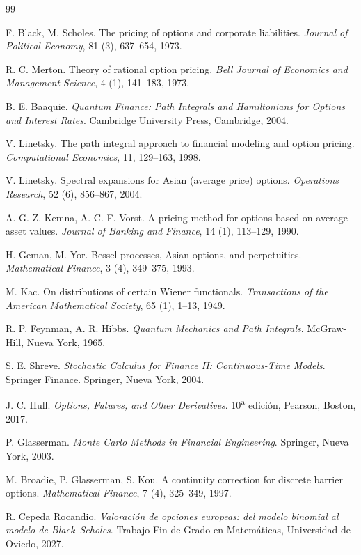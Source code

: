 \begin{thebibliography}{99}

F. Black, M. Scholes.
The pricing of options and corporate liabilities.
\emph{Journal of Political Economy}, 81 (3), 637--654, 1973.

R. C. Merton.
Theory of rational option pricing.
\emph{Bell Journal of Economics and Management Science}, 4 (1),
141--183, 1973.

B. E. Baaquie.
\emph{Quantum Finance: Path Integrals and Hamiltonians for Options
and Interest Rates}.
Cambridge University Press, Cambridge, 2004.

V. Linetsky.
The path integral approach to financial modeling and option pricing.
\emph{Computational Economics}, 11, 129--163, 1998.

V. Linetsky.
Spectral expansions for Asian (average price) options.
\emph{Operations Research}, 52 (6), 856--867, 2004.

A. G. Z. Kemna, A. C. F. Vorst.
A pricing method for options based on average asset values.
\emph{Journal of Banking and Finance}, 14 (1), 113--129, 1990.

H. Geman, M. Yor.
Bessel processes, Asian options, and perpetuities.
\emph{Mathematical Finance}, 3 (4), 349--375, 1993.

M. Kac.
On distributions of certain Wiener functionals.
\emph{Transactions of the American Mathematical Society}, 65 (1),
1--13, 1949.

R. P. Feynman, A. R. Hibbs.
\emph{Quantum Mechanics and Path Integrals}.
McGraw-Hill, Nueva York, 1965.

S. E. Shreve.
\emph{Stochastic Calculus for Finance II: Continuous-Time Models}.
Springer Finance. Springer, Nueva York, 2004.

J. C. Hull.
\emph{Options, Futures, and Other Derivatives}.
10\textsuperscript{a} edición, Pearson, Boston, 2017.

P. Glasserman.
\emph{Monte Carlo Methods in Financial Engineering}.
Springer, Nueva York, 2003.

M. Broadie, P. Glasserman, S. Kou.
A continuity correction for discrete barrier options.
\emph{Mathematical Finance}, 7 (4), 325--349, 1997.

R. Cepeda Rocandio.
\emph{Valoración de opciones europeas: del modelo binomial al modelo
de Black--Scholes}.
Trabajo Fin de Grado en Matemáticas, Universidad de Oviedo, 2027.

\end{thebibliography}

